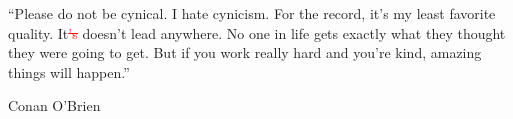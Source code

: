 \documentclass[
11pt, %
english, %
singlespacing, %
headsepline, %
oneside,]{BachelorMasterThesis} %
\newcommand{\red}[1]{\textcolor{red}{#1}}
\newcommand{\remove}[1]{\red{\st{#1}}}
\begin{document}
\cleardoublepage


\vspace*{0.2\textheight}

\noindent\enquote{Please do not be cynical. I hate cynicism. For the record, it's my least favorite quality. It\remove{'s} doesn't lead anywhere. No one in life gets exactly what they thought they were going to get. But if you work really hard and you're kind, amazing things will happen.}\bigbreak

\hfill Conan O'Brien

\end{document}
